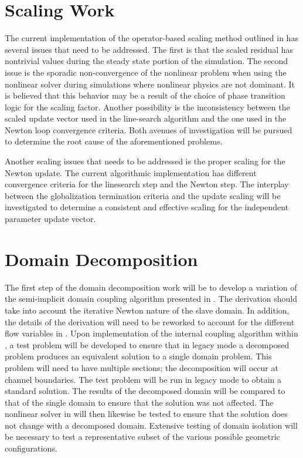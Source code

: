 \section{Scaling Work}
\label{sect:proposal_scaling}
The current implementation of the operator-based scaling method outlined in  has several issues that need to be addressed.
The first is that the scaled residual has nontrivial values during the steady state portion of the simulation.
The second issue is the sporadic non-convergence of the nonlinear problem when using the nonlinear solver during simulations where nonlinear physics are not dominant.
It is believed that this behavior may be a result of the choice of phase transition logic for the scaling factor.
Another possibility is the inconsistency between the scaled update vector used in the line-search algorithm and the one used in the Newton loop convergence criteria.
Both avenues of investigation will be pursued to determine the root cause of the aforementioned problems.

Another scaling issues that needs to be addressed is the proper scaling for the Newton update.
The current algorithmic implementation has different convergence criteria for the linesearch step and the Newton step.
The interplay between the globalization termination criteria and the update scaling will be investigated to determine a consistent and effective scaling for the independent parameter update vector. 

\section{Domain Decomposition}
\label{sect:domain_coupling}
The first step of the domain decomposition work will be to develop a variation of the semi-implicit domain coupling algorithm presented in .
The derivation should take into account the iterative Newton nature of the slave domain. 
In addition, the details of the derivation will need to be reworked to account for the different flow variables in \cobra{}.
Upon implementation of the internal coupling algorithm within \cobra{}, a test problem will be developed to ensure that in legacy mode a decomposed problem produces an equivalent solution to a single domain problem.
This problem will need to have multiple sections; the decomposition will occur at channel boundaries.
The test problem will be run in legacy mode to obtain a standard solution.
The results of the decomposed domain will be compared to that of the single domain to ensure that the solution was not affected.
The nonlinear solver in \cobra{} will then likewise be tested to ensure that the solution does not change with a decomposed domain.
Extensive testing of domain isolation will be necessary to test a representative subset of the various possible geometric configurations.

